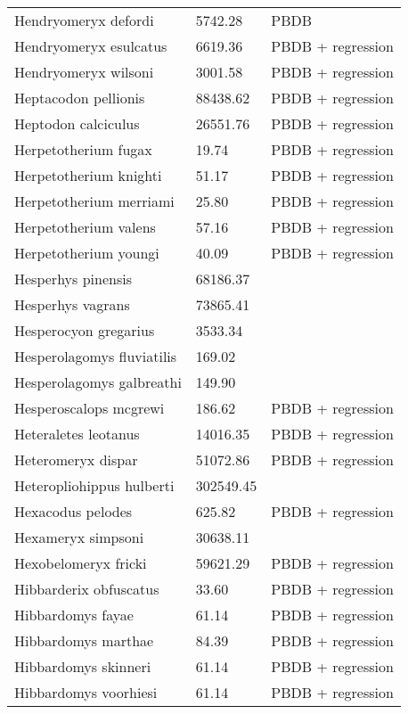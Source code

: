 \documentclass{article}
\begin{document}
\begin{center}
\begin{longtable}{p{} p{} p{}}
    Hendryomeryx defordi & 5742.28 & PBDB \\ 
    Hendryomeryx esulcatus & 6619.36 & PBDB + regression \\ 
    Hendryomeryx wilsoni & 3001.58 & PBDB + regression \\ 
    Heptacodon pellionis & 88438.62 & PBDB + regression \\ 
    Heptodon calciculus & 26551.76 & PBDB + regression \\ 
    Herpetotherium fugax & 19.74 & PBDB + regression \\ 
    Herpetotherium knighti & 51.17 & PBDB + regression \\ 
    Herpetotherium merriami & 25.80 & PBDB + regression \\ 
    Herpetotherium valens & 57.16 & PBDB + regression \\ 
    Herpetotherium youngi & 40.09 & PBDB + regression \\ 
    Hesperhys pinensis & 68186.37 & \cite{Tomiya2013} \\ 
    Hesperhys vagrans & 73865.41 & \cite{Tomiya2013} \\ 
    Hesperocyon gregarius & 3533.34 & \cite{Tomiya2013} \\ 
    Hesperolagomys fluviatilis & 169.02 & \cite{Tomiya2013} \\ 
    Hesperolagomys galbreathi & 149.90 & \cite{Tomiya2013} \\ 
    Hesperoscalops mcgrewi & 186.62 & PBDB + regression \\ 
    Heteraletes leotanus & 14016.35 & PBDB + regression \\ 
    Heteromeryx dispar & 51072.86 & PBDB + regression \\ 
    Heteropliohippus hulberti & 302549.45 & \cite{Tomiya2013} \\ 
    Hexacodus pelodes & 625.82 & PBDB + regression \\ 
    Hexameryx simpsoni & 30638.11 & \cite{Tomiya2013} \\ 
    Hexobelomeryx fricki & 59621.29 & PBDB + regression \\ 
    Hibbarderix obfuscatus & 33.60 & PBDB + regression \\ 
    Hibbardomys fayae & 61.14 & PBDB + regression \\ 
    Hibbardomys marthae & 84.39 & PBDB + regression \\ 
    Hibbardomys skinneri & 61.14 & PBDB + regression \\ 
    Hibbardomys voorhiesi & 61.14 & PBDB + regression \\ 

\end{longtable}
\end{center}
\end{document}
